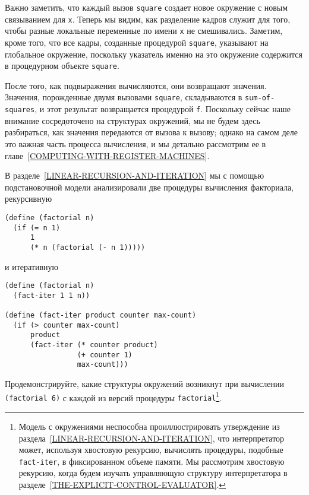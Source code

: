 Важно заметить, что каждый вызов {\tt square}
создает новое окружение с новым связыванием для {\tt x}.
Теперь мы видим, как разделение кадров служит для того, чтобы разные
локальные переменные по имени {\tt x} не смешивались.  Заметим,
кроме того, что все кадры, созданные процедурой
{\tt square}, указывают на глобальное окружение, поскольку
указатель именно на это окружение содержится в процедурном
объекте {\tt square}.

После того, как подвыражения вычисляются, они возвращают
значения.  Значения, порожденные двумя вызовами
{\tt square}, складываются в {\tt sum-of-squares}, и
этот результат возвращается процедурой {\tt f}.  Поскольку
сейчас наше внимание сосредоточено на структурах окружений, мы не
будем здесь разбираться, как значения передаются от вызова к вызову; однако
на самом деле это важная часть процесса вычисления, и мы детально
рассмотрим ее в главе~\ref{COMPUTING-WITH-REGISTER-MACHINES}.
\begin{exercise}{3.9}\label{EX3.9}%
%
%
В разделе~\ref{LINEAR-RECURSION-AND-ITERATION} мы с помощью
подстановочной модели анализировали две процедуры вычисления
факториала, рекурсивную

\begin{Verbatim}[fontsize=\small]
(define (factorial n)
  (if (= n 1)
      1
      (* n (factorial (- n 1)))))
\end{Verbatim}
и итеративную

\begin{Verbatim}[fontsize=\small]
(define (factorial n)
  (fact-iter 1 1 n))

(define (fact-iter product counter max-count)
  (if (> counter max-count)
      product
      (fact-iter (* counter product)
                 (+ counter 1)
                 max-count)))
\end{Verbatim}
Продемонстрируйте, какие структуры окружений возникнут при вычислении
{\tt (fac\-to\-rial 6)} с каждой из версий процедуры
{\tt factorial}\footnote{Модель с окружениями неспособна проиллюстрировать
утверждение из раздела~\ref{LINEAR-RECURSION-AND-ITERATION}, что
интерпретатор может, используя
хвостовую рекурсию, вычислять
процедуры, подобные {\tt fact-iter}, в фиксированном объеме
памяти.  Мы рассмотрим
хвостовую рекурсию, когда будем изучать
управляющую структуру интерпретатора в
разделе~\ref{THE-EXPLICIT-CONTROL-EVALUATOR}.}.
\end{exercise}

